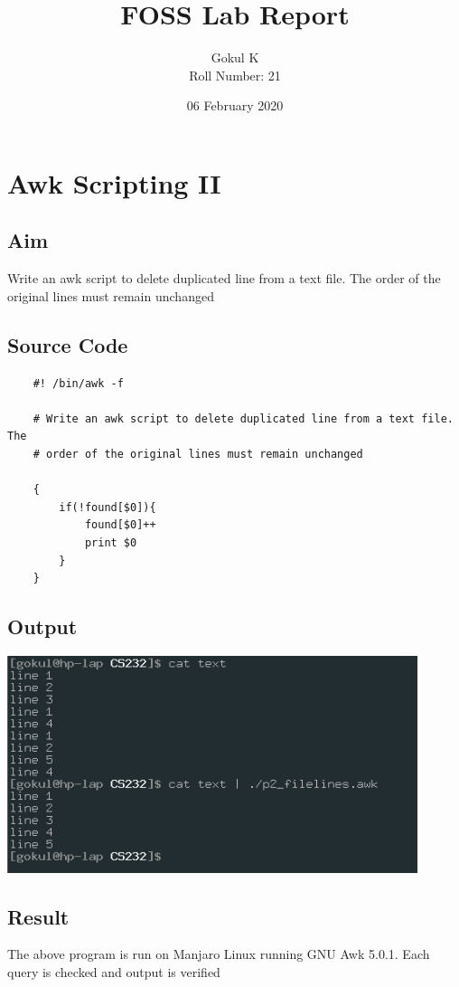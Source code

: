 \documentclass{article}
\begin{document}
\title{FOSS Lab Report}
\author{Gokul K\\[2\baselineskip]
Roll Number: 21\\[2\baselineskip]}
\date{06 February 2020}

\maketitle

\setcounter{section}{16}
\section{Awk Scripting II}
\subsection{Aim}
Write an awk script to delete duplicated line from a text file. The 
order of the original lines must remain unchanged

\subsection{Source Code}
\begin{verbatim}
    #! /bin/awk -f

    # Write an awk script to delete duplicated line from a text file. The 
    # order of the original lines must remain unchanged
    
    {
        if(!found[$0]){
            found[$0]++
            print $0
        }
    }
\end{verbatim}

\subsection{Output}
\includegraphics[width=0.9\textwidth]{img/p17/ss.png}\newline

\subsection{Result}
The above program is run on Manjaro Linux running GNU Awk 5.0.1. 
Each query is checked and output is verified
\end{document}
